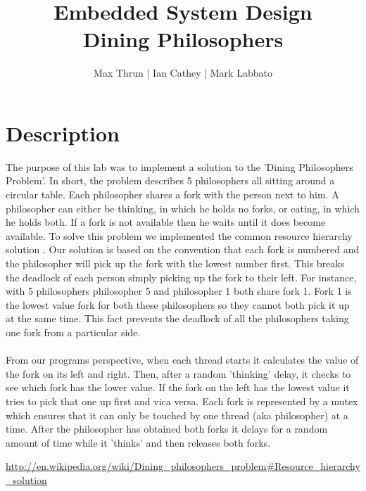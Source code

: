 \documentclass[12pt]{article}
\title{Embedded System Design \\ Dining Philosophers}
\author{ Max Thrun | Ian Cathey | Mark Labbato }
\begin{document}
\maketitle

\section*{Description}

The purpose of this lab was to implement a solution to the
'Dining Philosophers Problem'. In short, the problem describes
5 philosophers all sitting around a circular table. Each philosopher
shares a fork with the person next to him. A philosopher can either
be thinking, in which he holds no forks, or eating, in which he holds
both. If a fork is not available then he waits until it
does become available. To solve this problem we implemented the common
resource hierarchy solution \cite{sol}. Our solution is based on the
convention that each fork is numbered and the philosopher will pick up
the fork with the lowest number first. This breaks the deadlock of each
person simply picking up the fork to their left. For instance, with 5
philosophers philosopher 5 and philosopher 1 both share fork 1. Fork 1
is the lowest value fork for both these philosophers so they cannot both
pick it up at the same time. This fact prevents the deadlock of all the
philosophers taking one fork from a particular side.
\\\\
From our programs perspective, when each thread starts it calculates the
value of the fork on its left and right. Then, after a random 'thinking'
delay, it checks to see which fork has the lower value. If the fork on the
left has the lowest value it tries to pick that one up first and vica versa.
Each fork is represented by a mutex which ensures that it can only be touched
by one thread (aka philosopher) at a time. After the philosopher has obtained both
forks it delays for a random amount of time while it 'thinks' and then releases
both forks.

\begin{thebibliography}{9}
     \url{http://en.wikipedia.org/wiki/Dining_philosophers_problem#Resource_hierarchy_solution}
\end{thebibliography}
\end{document}
